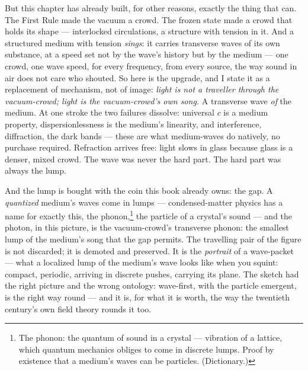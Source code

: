 \documentclass[fontsize=11pt,paper=a4,pagesize=auto,parskip=half-]{scrbook}
\begin{document}
But this chapter has already built, for other reasons, exactly the thing that can. The First Rule made the vacuum a crowd. The frozen state made a crowd that holds its shape --- interlocked circulations, a structure with tension in it. And a structured medium with tension \emph{sings}: it carries transverse waves of its own substance, at a speed set not by the wave's history but by the medium --- one crowd, one wave speed, for every frequency, from every source, the way sound in air does not care who shouted. So here is the upgrade, and I state it as a replacement of mechanism, not of image: \emph{light is not a traveller through the vacuum-crowd; light is the vacuum-crowd's own song.} A transverse wave \emph{of} the medium. At one stroke the two failures dissolve: universal $c$ is a medium property, dispersionlessness is the medium's linearity, and interference, diffraction, the dark bands --- these are what medium-waves do natively, no purchase required. Refraction arrives free: light slows in glass because glass is a denser, mixed crowd. The wave was never the hard part. The hard part was always the lump.

And the lump is bought with the coin this book already owns: the gap. A \emph{quantized} medium's waves come in lumps --- condensed-matter physics has a name for exactly this, the phonon,\footnote{The phonon: the quantum of sound in a crystal --- vibration of a lattice, which quantum mechanics obliges to come in discrete lumps. Proof by existence that a medium's waves can be particles. (Dictionary.)} the particle of a crystal's sound --- and the photon, in this picture, is the vacuum-crowd's transverse phonon: the smallest lump of the medium's song that the gap permits. The travelling pair of the figure is not discarded; it is demoted and preserved. It is the \emph{portrait} of a wave-packet --- what a localized lump of the medium's wave looks like when you squint: compact, periodic, arriving in discrete pushes, carrying its plane. The sketch had the right picture and the wrong ontology: wave-first, with the particle emergent, is the right way round --- and it is, for what it is worth, the way the twentieth century's own field theory rounds it too.
\end{document}
